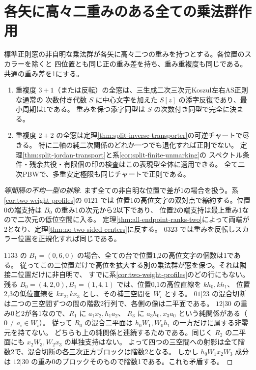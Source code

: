 \section{各矢に高々二重みのある全ての乗法群作用}
\label{sec:binary-torus-windows}
\begin{theorem}\label{thm:binary-torus-windows}
標準正則窓の非自明な乗法群が各矢に高々二つの重みを持つとする。各位置のスカラーを除くと
四位置とも同じ正の重み差を持ち、重み重複度も同じである。共通の重み差を1にする。
\begin{enumerate}
\item 重複度 $3+1$（または反転）の全窓は、三生成二次三次元Koszul左右AS正則な通常の
次数付き代数 $S$ に中心文字を加えた $S[z]$ の添字反復であり、最小周期は1である。
重みを保つ添字同型は $S$ の次数付き同型で完全に決まる。
\item 重複度 $2+2$ の全窓は定理\ref{thm:split-inverse-transporter}の可逆チャートで尽きる。
特に二軸の純二次関係のどれか一つでも退化すれば正則でない。
定理\ref{thm:split-jordan-transport}と系\ref{cor:split-finite-unmarking}の
スペクトル条件・残余共役・有限個の印の検査はこの表現型全体に適用できる。
全て二次PBWで、多重安定極限も同じチャートで正則である。
\end{enumerate}
\end{theorem}

\begin{proof}[等間隔の不均一型の排除]
まず全ての非自明な位置で差が1の場合を扱う。系\ref{cor:two-weight-profiles}の $0121$ では
位置1の高位文字の双対点で縮約する。位置0の端支持は $B_0$ の重み1の次元から2以下であり、
位置2の端支持は最上重み1なので二次元の低位空間に入る。
定理\ref{thm:all-endpoint-ranks-two}によって両端が2となり、定理\ref{thm:no-two-sided-centers}に反する。
$0323$ では重みを反転しスカラー位置を正規化すれば同じである。

$1133$ の $B_1=(0,6,0)$ の場合、全ての台で位置1,2の高位文字の個数は1である。
従ってこの二位置だけで高位を拡大する別の乗法群が窓を保つ。それは隣接二位置だけに非自明で、
すでに系\ref{cor:two-weight-profiles}のどの行にもない。
残る $B_0=(4,2,0),B_1=(1,4,1)$ では、位置0,1の高位直線を $kh_0,kh_1$、
位置2,3の低位直線を $kx_2,kx_3$ とし、その補三空間を $W_i$ とする。
$01|23$ の混合切断は二つの三空間ずつの間の階数2行列で、各側の像は二平面である。
$12|30$ の重み0と2が各1なので、$R_1$ に $a_1x_2,h_1a_2$、
$R_3$ に $a_3h_0,x_3a_0$ という純関係がある（$0\ne a_i\in W_i$）。
従って $R_0$ の混合二平面は $h_0W_1,W_0h_1$ の一方だけに属する非零元を持てない。
どちらも上の純関係と連続するためである。同じく $R_2$ の二平面にも $x_2 W_3,W_2x_3$ の単独支持はない。
よって四つの三空間への射影は全て階数2で、混合切断の各三次正方ブロックは階数2となる。
しかし $h_0W_1x_2W_3$ 成分は $12|30$ の重み0のブロックそのもので階数1である。これも矛盾する。
\end{proof}

